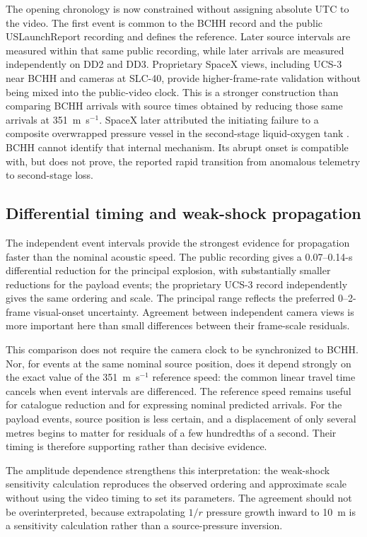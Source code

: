 \documentclass[]{seismica}
\begin{document}
The opening chronology is now constrained without assigning absolute UTC to the
video. The first event is common to the BCHH record and the public
USLaunchReport recording and defines the reference. Later source intervals are
measured within that same public recording, while later arrivals are measured
independently on DD2 and DD3. Proprietary SpaceX views, including UCS-3 near
BCHH and cameras at SLC-40, provide higher-frame-rate validation without being
mixed into the public-video clock. This is a stronger construction than
comparing BCHH arrivals with source times obtained by reducing those same
arrivals at 351~m~s$^{-1}$. SpaceX later attributed the
initiating failure to a composite overwrapped pressure vessel in the
second-stage liquid-oxygen tank \citep{spacex_anomaly_2017,nasa_sma_falcon9}.
BCHH cannot identify that internal mechanism. Its abrupt onset is compatible
with, but does not prove, the reported rapid transition from anomalous telemetry
to second-stage loss.

\subsection{Differential timing and weak-shock propagation}

The independent event intervals provide the strongest evidence for
propagation faster than the nominal acoustic speed. The public recording gives
a 0.07--0.14-s differential reduction for the principal explosion, with
substantially smaller reductions for the payload events; the proprietary UCS-3
record independently gives the same ordering and scale. The principal range
reflects the preferred 0--2-frame visual-onset uncertainty. Agreement between
independent camera views is more important here than small differences between
their frame-scale residuals.

This comparison does not require the camera clock to be synchronized to BCHH.
Nor, for events at the same nominal source position, does it depend strongly on
the exact value of the 351~m~s$^{-1}$ reference speed: the common linear travel
time cancels when event intervals are differenced. The reference speed remains
useful for catalogue reduction and for expressing nominal predicted arrivals.
For the payload events, source position is less certain, and a displacement of
only several metres begins to matter for residuals of a few hundredths of a
second. Their timing is therefore supporting rather than decisive evidence.

The amplitude dependence strengthens this interpretation: the weak-shock
sensitivity calculation reproduces the observed ordering and approximate scale
without using the video timing to set its parameters. The agreement should not
be overinterpreted, because extrapolating $1/r$ pressure growth inward to 10~m
is a sensitivity calculation rather than a source-pressure inversion.
\end{document}

